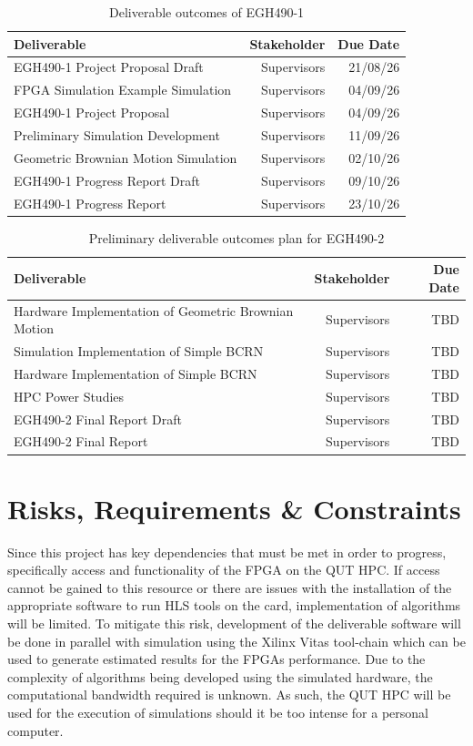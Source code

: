 \documentclass[11pt, a4paper]{article}
\begin{document}
	\begin{table}[h!]
		\begin{tabularx}{\textwidth}{|X|r|r|}\hline
			Deliverable & Stakeholder & Due Date\\\hline
			EGH490-1 Project Proposal Draft & Supervisors & 21/08/26\\
			FPGA Simulation Example Simulation & Supervisors & 04/09/26\\
			EGH490-1 Project Proposal & Supervisors & 04/09/26\\
			Preliminary Simulation Development & Supervisors & 11/09/26\\
			Geometric Brownian Motion Simulation & Supervisors & 02/10/26\\
			EGH490-1 Progress Report Draft & Supervisors & 09/10/26\\
			EGH490-1 Progress Report & Supervisors & 23/10/26\\\hline
		\end{tabularx}	
		\caption{Deliverable outcomes of EGH490-1}
	\end{table}
	
	\begin{table}[h!]
		\begin{tabularx}{\textwidth}{|X|r|r|}\hline
			Deliverable & Stakeholder & Due Date\\\hline
			Hardware Implementation of Geometric Brownian Motion & Supervisors & TBD\\
			Simulation Implementation of Simple BCRN & Supervisors & TBD\\
			Hardware Implementation of Simple BCRN & Supervisors & TBD\\
			HPC Power Studies & Supervisors & TBD\\
			EGH490-2 Final Report Draft & Supervisors & TBD\\
			EGH490-2 Final Report & Supervisors & TBD\\\hline
		\end{tabularx}	
		\caption{Preliminary deliverable outcomes plan for EGH490-2}
	\end{table}
	
	\section{Risks, Requirements \& Constraints}
	Since this project has key dependencies that must be met in order to progress, specifically access and functionality of the FPGA on the QUT HPC. If access cannot be gained to this resource or there are issues with the installation of the appropriate software to run HLS tools on the card, implementation of algorithms will be limited. To mitigate this risk, development of the deliverable software will be done in parallel with simulation using the Xilinx Vitas tool-chain which can be used to generate estimated results for the FPGAs performance. Due to the complexity of algorithms being developed using the simulated hardware, the computational bandwidth required is unknown. As such, the QUT HPC will be used for the execution of simulations should it be too intense for a personal computer. 
	
\end{document}
